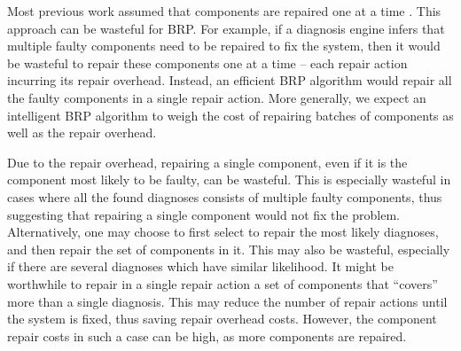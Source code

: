 Most previous work assumed that components are repaired one at a time \cite{heckerman1995decision,friedrich1992choosing,Nyberg12,Torta14}. This approach can be wasteful for BRP. For example, if a diagnosis engine infers that multiple faulty components need to be repaired to fix the system, then it would be wasteful to repair these components one at a time -- each repair action incurring its repair overhead. Instead, an efficient BRP algorithm would repair all the faulty components in a single repair action. More generally, we expect an intelligent BRP algorithm to weigh the cost of repairing batches of components as well as the repair overhead.

Due to the repair overhead, repairing a single component, even if it is the component most likely to be faulty, can be wasteful. This is especially wasteful in cases where all the found diagnoses consists of multiple faulty components, thus suggesting that repairing a single component would not fix the problem. Alternatively, one may choose to first select to repair the most likely diagnoses, and then repair the set of components in it. This may also be wasteful, especially if there are several diagnoses which have similar likelihood. It might be worthwhile to repair in a single repair action a set of components that ``covers'' more than a single diagnosis. This may reduce the number of repair actions until the system is fixed, thus saving repair overhead costs. However, the component repair costs in such a case can be high, as more components are repaired.


